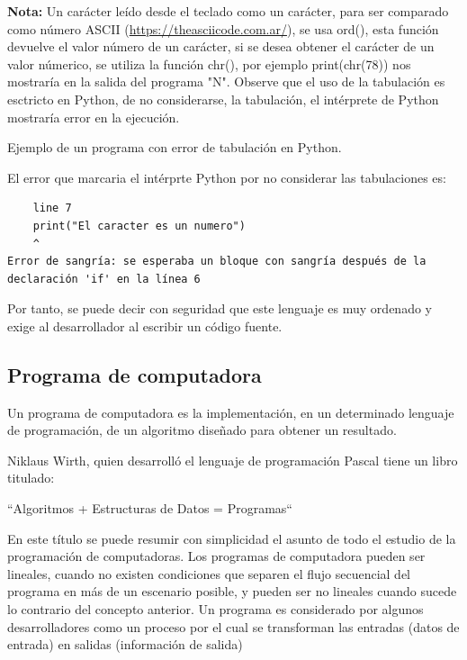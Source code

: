 \documentclass[12pt, a4paper]{article}
\begin{document}
\textbf{Nota:} Un carácter leído desde el teclado como un carácter, para ser comparado como número ASCII (\textcolor{blue}{\url{https://theasciicode.com.ar/}}), se usa ord(), esta función devuelve el valor número de un carácter, si se desea obtener el carácter de un valor númerico, se utiliza la función chr(), por ejemplo print(chr(78)) nos mostraría en la salida del  programa "N".
Observe que el uso de la tabulación es esctricto en Python, de no considerarse, la tabulación, el intérprete de Python mostraría error en la ejecución. 

\newpage
\begin{center}
	Ejemplo de un programa con error de tabulación en Python.
\end{center}



El error que marcaria el intérprte Python por no considerar las tabulaciones es:

\begin{verbatim}
	line 7
    print("El caracter es un numero")
    ^
Error de sangría: se esperaba un bloque con sangría después de la 
declaración 'if' en la línea 6
\end{verbatim}

Por tanto, se puede decir con seguridad que este lenguaje es muy ordenado y exige al desarrollador al escribir un código fuente.

\subsection{Programa de computadora}
Un programa de computadora es la implementación, en un determinado lenguaje de programación, de un algoritmo diseñado para obtener un resultado.

Niklaus Wirth, quien desarrolló el lenguaje de programación Pascal tiene un libro titulado:

\begin{center}
	``Algoritmos + Estructuras de Datos = Programas``
\end{center} 

En este título se puede resumir con simplicidad el asunto de todo el estudio de la programación de computadoras. 
Los programas de computadora pueden ser lineales, cuando no existen condiciones que separen el flujo secuencial del programa en más de un escenario posible, y pueden ser no lineales cuando sucede lo contrario del concepto anterior. 
Un programa es considerado por algunos desarrolladores como un proceso por el cual se transforman las entradas (datos de entrada) en salidas (información de salida)
\end{document}
